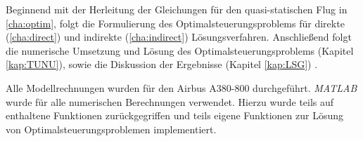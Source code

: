 Beginnend mit der Herleitung der Gleichungen für den quasi-statischen Flug in \autoref{cha:optim}, folgt die Formulierung des Optimalsteuerungsproblems für direkte (\autoref{cha:direct}) und indirekte (\autoref{cha:indirect}) Lösungsverfahren. Anschließend folgt die numerische Umsetzung und Lösung des Optimalsteuerungsproblems (Kapitel \ref{kap:TUNU}), sowie die Diskussion der Ergebnisse (Kapitel \ref{kap:LSG}) .

Alle Modellrechnungen wurden für den Airbus A380-800 \cite{A380Tech} durchgeführt. \textit{MATLAB} wurde für alle numerischen Berechnungen verwendet. Hierzu wurde teils auf enthaltene Funktionen zurückgegriffen und teils eigene Funktionen zur Lösung von Optimalsteuerungsproblemen implementiert.




